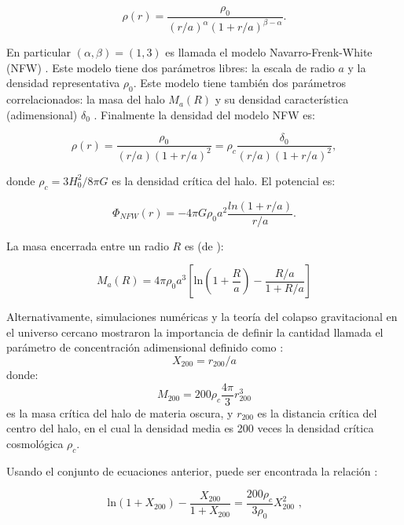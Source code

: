 \begin{equation}
\rho (r) = \frac{\rho_0}{(r/a)^\alpha (1+r/a)^{\beta-\alpha}}.
\end{equation}

En particular $(\alpha, \beta) = (1,3)$ es llamada el modelo Navarro-Frenk-White (NFW) \cite{NFW}. Este modelo tiene dos parámetros libres: la escala de radio $a$ y la densidad representativa $\rho_0$. Este modelo tiene también dos parámetros correlacionados: la masa del halo $M_a(R)$  y su densidad característica  (adimensional) $\delta_0$ \cite{NFW}. Finalmente la densidad del modelo NFW es:

$$\rho (r) =  \frac{\rho_0}{(r/a) (1+r/a)^2} = \rho_c \frac{\delta_0}{(r/a) (1+r/a)^2},$$

donde $\rho_c = 3H_0^2/8\pi G $ es la densidad crítica del halo. El potencial es:

\begin{equation}
\label{NFW0}
\Phi_{NFW} (r) = -4\pi G \rho_0 a^2 \frac{ln (1+r/a)}{r/a}.
\end{equation}

La masa encerrada entre un radio $R$ es (de \cite{J03}):

\begin{equation}
M_a(R) = 4\pi \rho_0 a^3 \left[  \textrm{ln} \left (  1+\frac{R}{a} \right ) - \frac{R/a}{1+R/a} \right ]
\label{eq:NFW_M}
\end{equation}

Alternativamente,  simulaciones numéricas y la teoría del colapso gravitacional en el universo cercano mostraron la importancia de definir la cantidad llamada el parámetro de concentración adimensional definido como \cite{Bosch}:
\begin{equation}
\label{NFW1}
X_{200}=r_{200}/a
\end{equation}
 donde: 
\begin{equation}
\label{NFW2}
M_{200}=200\rho_c \frac{4\pi}{3} r_{200}^3
\end{equation} 
es la masa crítica del halo de materia oscura, y  $r_{200}$ es la distancia crítica del centro del halo,  en el cual la densidad media es 200 veces la densidad crítica cosmológica $\rho_c$.

Usando el conjunto de ecuaciones anterior, puede ser encontrada la relación :

\begin{equation}
\label{NFW3}
  \textrm{ln}  (  1+X_{200} ) - \frac{X_{200}}{1+X_{200}} = \frac{200 \rho_c}{3\rho_0} X_{200}^2 \textrm{   ,}
  \end{equation}

